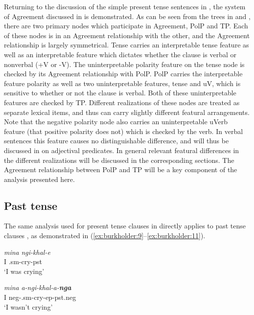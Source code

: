 \documentclass[output=paper]{langsci/langscibook}
\begin{document}
Returning to the discussion of the simple present tense sentences in , the system of Agreement discussed in  is demonstrated. As can be seen from the trees in  and , there are two primary nodes which participate in Agreement, PolP and TP. Each of these nodes is in an Agreement relationship with the other, and the Agreement relationship is largely symmetrical. Tense carries an interpretable tense feature as well as an interpretable feature which dictates whether the clause is verbal or nonverbal (+V or -V). The uninterpretable polarity feature on the tense node is checked by its Agreement relationship with PolP. PolP carries the interpretable feature polarity as well as two uninterpretable features, tense and uV, which is sensitive to whether or not the clause is verbal. Both of these uninterpretable features are checked by TP. Different realizations of these nodes are treated as separate lexical items, and thus can carry slightly different featural arrangements. Note that the negative polarity node also carries an uninterpretable uVerb feature (that positive polarity does not) which is checked by the verb. In verbal sentences this feature causes no distinguishable difference, and will thus be discussed in  on adjectival predicates. In general relevant featural differences in the different realizations will be discussed in the corresponding sections. The Agreement relationship between PolP and TP will be a key component of the analysis presented here.


\subsection{Past tense}

The same analysis used for present tense clauses in  directly applies to past tense clauses , as demonstrated in (\ref{ex:burkholder:9}--\ref{ex:burkholder:11}).



\begin{exe}
\ex\label{ex:burkholder:9} \begin{xlist}
\ex\label{ex:burkholder:9a} \gll \textit{mina} \textit{ngi-khal-e}\\
         I .{\sc sm}-cry-{\sc pst}\\
    \glt `I was crying'

\ex\label{ex:burkholder:9b} \gll \textit{mina} \textit{a-ngi-khal-a-\textbf{nga}}\\
         I {\sc neg}-.{\sc sm}-cry-{\sc ep}-{\sc pst.neg}\\
    \glt `I wasn't crying'
\end{xlist}
\end{exe}
\end{document}
